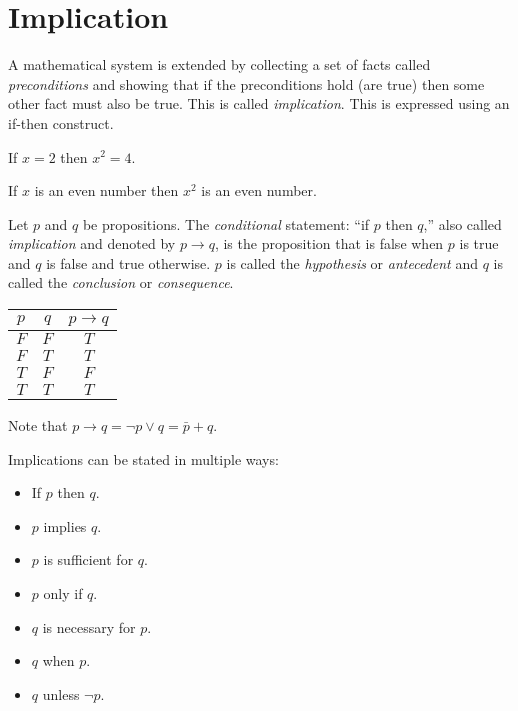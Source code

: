 \documentclass[letterpaper,12pt,fleqn]{article}
\renewcommand{\implies}{\rightarrow}
\begin{document}
\section*{Implication}

A mathematical system is extended by collecting a set of facts called \emph{preconditions} and showing that if the
preconditions hold (are true) then some other fact must also be true.  This is called \emph{implication}.  This is
expressed using an if-then construct.

\begin{examples}
  If \(x=2\) then \(x^2=4\).

  If \(x\) is an even number then \(x^2\) is an even number.
\end{examples}

\begin{definition}[Implication]
  Let \(p\) and \(q\) be propositions.  The \emph{conditional} statement: ``if \(p\) then \(q\),'' also called
  \emph{implication} and denoted by \(p\implies q\), is the proposition that is false when \(p\) is true and
  \(q\) is false and true otherwise.  \(p\) is called the \emph{hypothesis} or \emph{antecedent} and \(q\) is
  called the \emph{conclusion} or \emph{consequence}.

  \begin{center}
    \begin{tabular}{|cc|c|}
      \hline
      \(p\) & \(q\) & \(p\implies q\) \\
      \hline
      \(F\) & \(F\) & \(T\) \\
      \hline
      \(F\) & \(T\) & \(T\) \\
      \hline
      \(T\) & \(F\) & \(F\) \\
      \hline
      \(T\) & \(T\) & \(T\) \\
      \hline
    \end{tabular}
  \end{center}

  Note that \(p\implies q=\lnot p\lor q=\bar{p}+q\).
\end{definition}

Implications can be stated in multiple ways:
\begin{itemize}
\item If \(p\) then \(q\).
\item \(p\) implies \(q\).
\item \(p\) is sufficient for \(q\).
\item \(p\) only if \(q\).
\item \(q\) is necessary for \(p\).
\item \(q\) when \(p\).
\item \(q\) unless \(\lnot p\).
\end{itemize}
\end{document}
